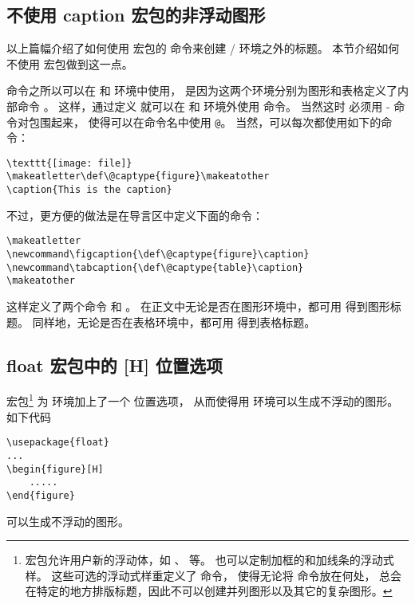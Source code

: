 \subsection{不使用 caption 宏包的非浮动图形}\label{ssec:nonfloat-nocaption}

以上篇幅介绍了如何使用  宏包的  命令来创建 / 环境之外的标题。
本节介绍如何不使用  宏包做到这一点。

 命令之所以可以在  和  环境中使用，
是因为这两个环境分别为图形和表格定义了内部命令 。
这样，通过定义  就可以在  和  环境外使用  命令。
当然这时  必须用 - 命令对包围起来，
使得可以在命令名中使用 \texttt{@}。
当然，可以每次都使用如下的命令：
\begin{lstlisting}
\texttt{[image: file]} 
\makeatletter\def\@captype{figure}\makeatother 
\caption{This is the caption}
\end{lstlisting}
不过，更方便的做法是在导言区中定义下面的命令：
\begin{lstlisting}
\makeatletter 
\newcommand\figcaption{\def\@captype{figure}\caption} 
\newcommand\tabcaption{\def\@captype{table}\caption} 
\makeatother
\end{lstlisting}
这样定义了两个命令  和 。
在正文中无论是否在图形环境中，都可用  得到图形标题。
同样地，无论是否在表格环境中，都可用  得到表格标题。

\subsection{float 宏包中的 [H] 位置选项}

 宏包\footnote{
	 宏包允许用户新的浮动体，如 、 等。
	也可以定制加框的和加线条的浮动式样。
	这些可选的浮动式样重定义了  命令，
	使得无论将  命令放在何处，
	总会在特定的地方排版标题，因此不可以创建并列图形以及其它的复杂图形。}
为  环境加上了一个 \opt{[H]} 位置选项，
从而使得用  环境可以生成不浮动的图形。
如下代码
\begin{lstlisting}
\usepackage{float}
...
\begin{figure}[H]
	.....
\end{figure}
\end{lstlisting}
可以生成不浮动的图形。

